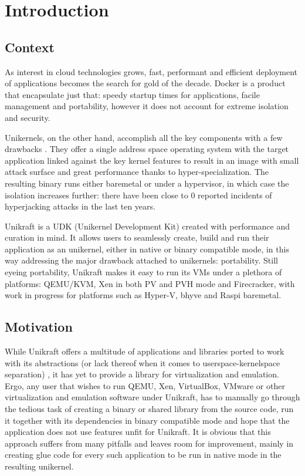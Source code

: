 \chapter{Introduction}
\label{chapter:intro}

\section{Context}
\label{sec:context}

As interest in cloud technologies grows, fast, performant and efficient deployment of applications becomes the search for gold of the decade.
Docker \cite{docker} is a product that encapsulate just that: speedy startup times for applications, facile management and portability, however it does not account for extreme isolation and security.

Unikernels, on the other hand, accomplish all the key components with a few drawbacks \cite{vm-safer}.
They offer a single address space operating system with the target application linked against the key kernel features to result in an image with small attack surface and great performance thanks to hyper-specialization.
The resulting binary runs either baremetal or under a hypervisor, in which case the isolation increases further: there have been close to 0 reported incidents of hyperjacking attacks in the last ten years.

Unikraft is a UDK (Unikernel Development Kit) \cite{unikraft} created with performance and curation in mind.
It allows users to seamlessly create, build and run their application as an unikernel, either in native or binary compatible mode, in this way addressing the major drawback attached to unikernels: portability.
Still eyeing portability, Unikraft makes it easy to run its VMs under a plethora of platforms: QEMU/KVM, Xen in both PV and PVH mode and Firecracker, with work in progress for platforms such as Hyper-V, bhyve and Raspi baremetal.

\section{Motivation}
\label{sec:motivation}

While Unikraft offers a multitude of applications and libraries ported to work with its abstractions (or lack thereof when it comes to userspace-kernelspace separation) \cite{catalog-core} \cite{catalog}, it has yet to provide a library for virtualization and emulation.
Ergo, any user that wishes to run QEMU, Xen, VirtualBox, VMware or other virtualization and emulation software under Unikraft, has to manually go through the tedious task of creating a binary or shared library from the source code, run it together with its dependencies in binary compatible mode and hope that the application does not use features unfit for Unikraft.
It is obvious that this approach suffers from many pitfalls and leaves room for improvement, mainly in creating glue code for every such application to be run in native mode in the resulting unikernel.

